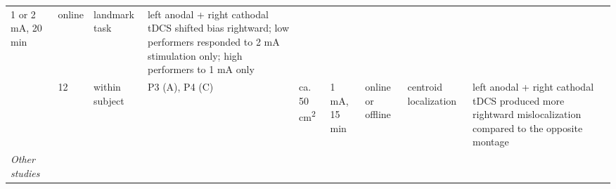\documentclass[11pt,]{memoir}
\begin{document}
\begin{longtable}[]{@{}lllllllll@{}}
\begin{minipage}[t]{0.04\columnwidth}
1 or 2
mA, 20
min\strut
\end{minipage} & \begin{minipage}[t]{0.04\columnwidth}\raggedright
online\strut
\end{minipage} & \begin{minipage}[t]{0.10\columnwidth}\raggedright
landmark task\strut
\end{minipage} & \begin{minipage}[t]{0.28\columnwidth}\raggedright
left anodal + right cathodal tDCS shifted bias rightward;
low performers responded to 2 mA stimulation only; high
performers to 1 mA only\strut
\end{minipage}\tabularnewline
\begin{minipage}[t]{0.09\columnwidth}\raggedright
\textcite{Wright2014}\strut
\end{minipage} & \begin{minipage}[t]{0.02\columnwidth}\raggedright
12\strut
\end{minipage} & \begin{minipage}[t]{0.04\columnwidth}\raggedright
within
subject\strut
\end{minipage} & \begin{minipage}[t]{0.10\columnwidth}\raggedright
P3 (A), P4 (C)\strut
\end{minipage} & \begin{minipage}[t]{0.04\columnwidth}\raggedright
ca.
50
cm\textsuperscript{2}\strut
\end{minipage} & \begin{minipage}[t]{0.04\columnwidth}\raggedright
1 mA,
15 min\strut
\end{minipage} & \begin{minipage}[t]{0.04\columnwidth}\raggedright
online
or
offline\strut
\end{minipage} & \begin{minipage}[t]{0.10\columnwidth}\raggedright
centroid
localization\strut
\end{minipage} & \begin{minipage}[t]{0.28\columnwidth}\raggedright
left anodal + right cathodal tDCS produced more rightward
mislocalization compared to the opposite montage\strut
\end{minipage}\tabularnewline
\begin{minipage}[t]{0.09\columnwidth}\raggedright
\emph{Other studies}\strut
\end{minipage} & \begin{minipage}[t]{0.02\columnwidth}\raggedright

\end{minipage}
\end{longtable}
\end{document}

